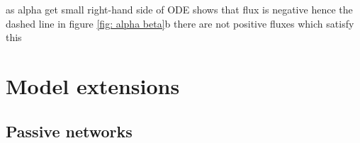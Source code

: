 \documentclass{jfm}
\newcommand{\note}[1]{{\color{Ncolour} \fontsize{14}{16.8}\selectfont \textbf{#1}}}
\begin{document}

   
as alpha get small right-hand side of ODE shows that flux is negative hence the dashed line in figure \ref{fig: alpha beta}b there are not positive fluxes which satisfy this 

 
 \section{Model extensions} \label{sec: extensions}

 
 
 \subsection{Passive networks} \label{sec: networks}
 
\end{document}
